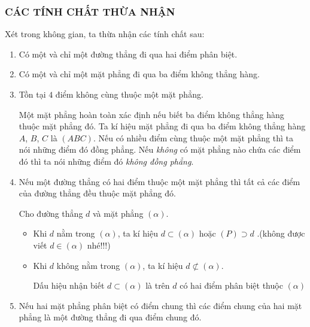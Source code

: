 \subsubsection{CÁC TÍNH CHẤT THỪA NHẬN}
Xét trong không gian, ta thừa nhận các tính chất sau:
\begin{enumerate}[\iconMT]
	\item {} Có một và chỉ một đường thẳng đi qua hai điểm phân biệt.
	\item {} Có một và chỉ một mặt phẳng đi qua ba điểm không thẳng hàng.
	\item {} Tồn tại $4$ điểm không cùng thuộc một mặt phẳng.
	\begin{tcolorbox}[colframe=cyan,colback=cyan!3!white,boxrule=0.5mm]
		Một mặt phẳng hoàn toàn xác định nếu biết ba điểm không thẳng hàng thuộc mặt phẳng đó. Ta kí hiệu mặt phẳng đi qua ba điểm không thẳng hàng $A$, $B$, $C$ là $(A B C)$. Nếu có nhiều điểm cùng thuộc một mặt phẳng thì ta nói những điểm đó đồng phẳng. Nếu \textit{không} có mặt phẳng nào chứa các điểm đó thì ta nói những điểm đó \textit{không đồng phẳng}.
	\end{tcolorbox}
	\item {} Nếu một đường thẳng có hai điểm thuộc một mặt phẳng thì tất cả các điểm của đường thẳng đều thuộc mặt phẳng đó.\\
	\begin{tcolorbox}[colframe=cyan,colback=cyan!3!white,boxrule=0.5mm]
		Cho đường thẳng $d$ và mặt phẳng $(\alpha)$.
		\begin{itemize}
			\item [\ding{172}] Khi $d$ nằm trong $(\alpha)$, ta kí hiệu $d \subset (\alpha)$ hoặc $(P) \supset d$ .\quad (không được viết  $d \in (\alpha)$ nhé!!!)
			\item [\ding{173}] Khi $d$ không nằm trong $(\alpha)$, ta kí hiệu $d \not\subset (\alpha)$.
			\begin{luuy}
				Dấu hiệu nhận biết $d \subset (\alpha)$  là trên $d$ có hai điểm phân biệt thuộc $(\alpha)$
			\end{luuy}
		\end{itemize}
	\end{tcolorbox}
	\item {} Nếu hai mặt phẳng phân biệt có điểm chung thì các điểm chung của hai mặt phẳng là một đường thẳng đi qua điểm chung đó.
	\immini{
	\begin{tcolorbox}[colframe=cyan,colback=cyan!3!white,boxrule=0.5mm]

\end{tcolorbox}}
\end{enumerate}
